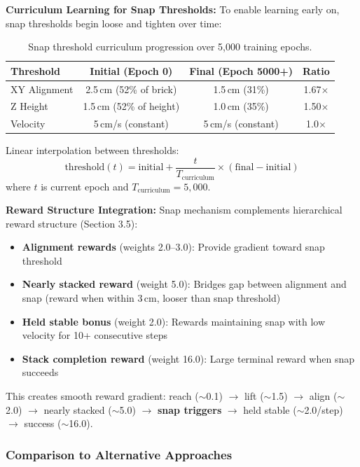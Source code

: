 \documentclass[12pt,a4paper,oneside]{report}
\begin{document}
\textbf{Curriculum Learning for Snap Thresholds:}
To enable learning early on, snap thresholds begin loose and tighten over time:

\begin{table}[h]
\centering
\begin{tabular}{|l|c|c|c|}
\hline
\textbf{Threshold} & \textbf{Initial (Epoch 0)} & \textbf{Final (Epoch 5000+)} & \textbf{Ratio} \\
\hline
XY Alignment & 2.5\,cm (52\% of brick) & 1.5\,cm (31\%) & 1.67$\times$ \\
Z Height & 1.5\,cm (52\% of height) & 1.0\,cm (35\%) & 1.50$\times$ \\
Velocity & 5\,cm/s (constant) & 5\,cm/s (constant) & 1.0$\times$ \\
\hline
\end{tabular}
\caption{Snap threshold curriculum progression over 5{,}000 training epochs.}
\end{table}

Linear interpolation between thresholds:
\[
\text{threshold}(t) = \text{initial} + \frac{t}{T_{\text{curriculum}}} \times (\text{final} - \text{initial})
\]
where $t$ is current epoch and $T_{\text{curriculum}} = 5{,}000$.

\textbf{Reward Structure Integration:}
Snap mechanism complements hierarchical reward structure (Section 3.5):
\begin{itemize}
    \item \textbf{Alignment rewards} (weights 2.0--3.0): Provide gradient toward snap threshold
    \item \textbf{Nearly stacked reward} (weight 5.0): Bridges gap between alignment and snap (reward when within 3\,cm, looser than snap threshold)
    \item \textbf{Held stable bonus} (weight 2.0): Rewards maintaining snap with low velocity for 10+ consecutive steps
    \item \textbf{Stack completion reward} (weight 16.0): Large terminal reward when snap succeeds
\end{itemize}

This creates smooth reward gradient: reach ($\sim$0.1) $\rightarrow$ lift ($\sim$1.5) $\rightarrow$ align ($\sim$2.0) $\rightarrow$ nearly stacked ($\sim$5.0) $\rightarrow$ \textbf{snap triggers} $\rightarrow$ held stable ($\sim$2.0/step) $\rightarrow$ success ($\sim$16.0).

\subsubsection{Comparison to Alternative Approaches}
\end{document}
